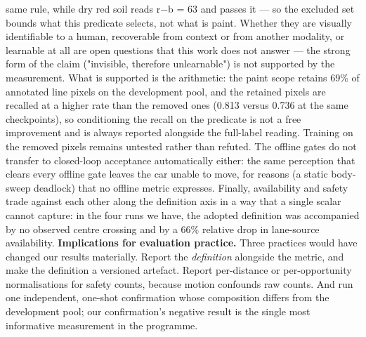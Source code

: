 \documentclass[journal]{IEEEtran}
\begin{document}
same rule, while dry red soil reads r−b = 63 and passes it --- so the excluded set bounds what this
predicate selects, not what is paint. Whether
they are visually identifiable to a human, recoverable from context or from another modality, or learnable at
all are open questions that this work does not answer --- the strong form of the claim ("invisible, therefore
unlearnable") is not supported by the measurement. What is supported is the arithmetic: the paint scope
retains 69\% of annotated line pixels on the development pool, and the retained pixels are recalled at a
higher rate than the removed ones (0.813 versus 0.736 at the same checkpoints), so conditioning the recall on
the predicate is not a free improvement and is always reported alongside the full-label reading. Training on
the removed pixels remains untested rather than refuted.
The offline gates do not transfer to closed-loop acceptance automatically either: the same perception that
clears every offline gate leaves the car unable to move, for reasons (a static body-sweep deadlock) that no
offline metric expresses. Finally, availability and safety trade against each other along the definition
axis in a way that a single scalar cannot capture: in the four runs we have, the adopted definition was
accompanied by no observed centre crossing and by a 66\% relative drop in lane-source availability.
\textbf{Implications for evaluation practice.} Three practices would have changed our results materially.
Report the \emph{definition} alongside the metric, and make the definition a versioned artefact. Report
per-distance or per-opportunity normalisations for safety counts, because motion confounds raw
counts. And run one independent, one-shot confirmation whose composition differs from the
development pool; our confirmation's negative result is the single most informative measurement in
the programme.
\end{document}
